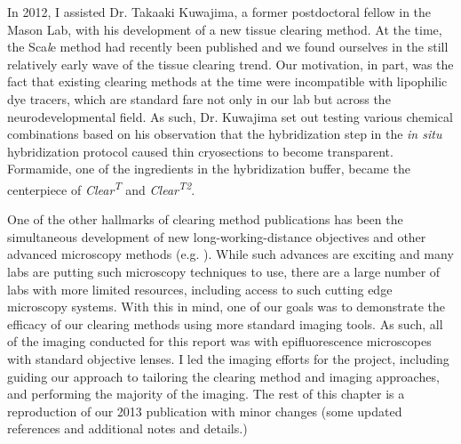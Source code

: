 In 2012, I assisted Dr. Takaaki Kuwajima, a former postdoctoral fellow in the Mason Lab, with his development of a new tissue clearing method.
At the time, the Sca{\it l}e method had recently been published \cite{hama2011scale} and we found ourselves in the still relatively early wave of the tissue clearing trend.
Our motivation, in part, was the fact that existing clearing methods at the time were incompatible with lipophilic dye tracers, which are standard fare not only in our lab but across the neurodevelopmental field.
As such, Dr. Kuwajima set out testing various chemical combinations based on his observation that the hybridization step in the \emph{in situ} hybridization protocol caused thin cryosections to become transparent.
Formamide, one of the ingredients in the hybridization buffer, became the centerpiece of {\it Clear\textsuperscript{T}} and {\it Clear\textsuperscript{T2}}.

One of the other hallmarks of clearing method publications has been the simultaneous development of new long-working-distance objectives and other advanced microscopy methods (e.g. ).
While such advances are exciting and many labs are putting such microscopy techniques to use, there are a large number of labs with more limited resources, including access to such cutting edge microscopy systems.
With this in mind, one of our goals was to demonstrate the efficacy of our clearing methods using more standard imaging tools.
As such, all of the imaging conducted for this report was with epifluorescence microscopes with standard objective lenses.
I led the imaging efforts for the project, including guiding our approach to tailoring the clearing method and imaging approaches, and performing the majority of the imaging.
The rest of this chapter is a reproduction of our 2013 publication \cite{kuwajima2013cleart} with minor changes (some updated references and additional notes and details.)
